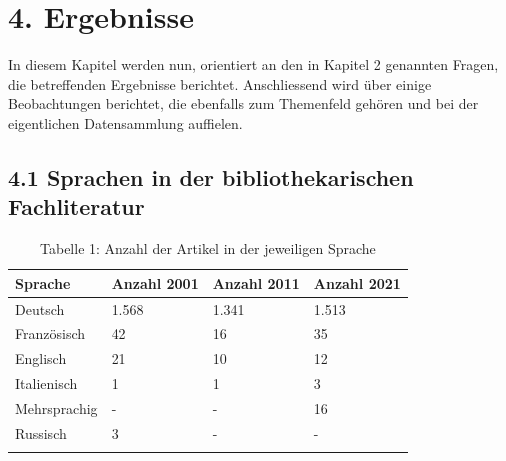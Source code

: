 \documentclass[a4paper,
fontsize=11pt,
oneside,
numbers=noperiodatend,
parskip=half-,
bibliography=totoc,
final
]{scrartcl}
\begin{document}
\hypertarget{ergebnisse}{%
\section{4. Ergebnisse}\label{ergebnisse}}

In diesem Kapitel werden nun, orientiert an den in Kapitel 2 genannten
Fragen, die betreffenden Ergebnisse berichtet. Anschliessend wird über
einige Beobachtungen berichtet, die ebenfalls zum Themenfeld gehören und
bei der eigentlichen Datensammlung auffielen.

\hypertarget{sprachen-in-der-bibliothekarischen-fachliteratur-1}{%
\subsection{4.1 Sprachen in der bibliothekarischen
Fachliteratur}\label{sprachen-in-der-bibliothekarischen-fachliteratur-1}}

\renewcommand*{\arraystretch}{1.4}
\begin{longtable}{llll}
\textbf{Sprache} & \textbf{Anzahl 2001} & \textbf{Anzahl 2011} & \textbf{Anzahl 2021} \\
\hline
Deutsch          & 1.568                & 1.341                & 1.513                \\
Französisch      & 42                   & 16                   & 35                   \\
Englisch         & 21                   & 10                   & 12                   \\
Italienisch      & 1                    & 1                    & 3                    \\
Mehrsprachig     & -                    & -                    & 16                   \\
Russisch         & 3                    & -                    & -                   \\
\caption{Tabelle 1: Anzahl der Artikel in der jeweiligen Sprache}\\
\end{longtable}
\end{document}
